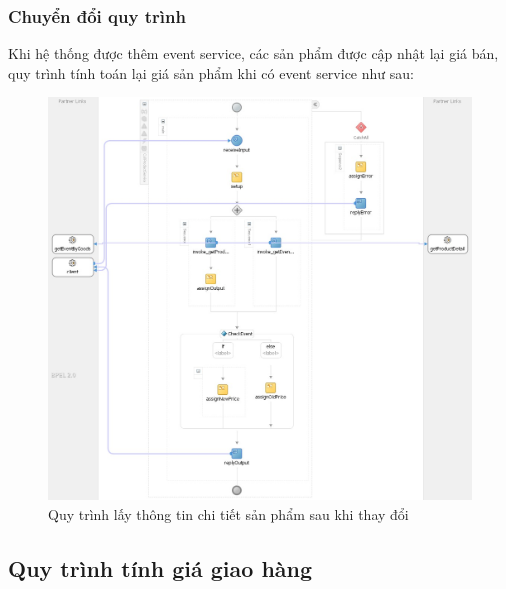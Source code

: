 \subsubsection*{Chuyển đổi quy trình}
Khi hệ thống được thêm event service, các sản phẩm được cập nhật lại giá bán, quy trình tính toán lại giá sản phẩm khi có event service như sau:
\begin{figure}[!htp]
    \centering
    \includegraphics[width=14cm]{img/bpel/productDetailAfter.jpg}
    \newline
    \caption{Quy trình lấy thông tin chi tiết sản phẩm sau khi thay đổi}
\end{figure}

\newpage
\subsection{Quy trình tính giá giao hàng}
